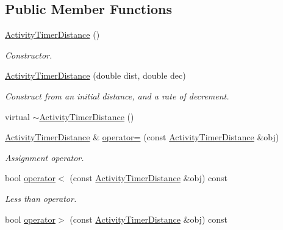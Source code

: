 \subsection*{\-Public \-Member \-Functions}
\begin{DoxyCompactItemize}
\item 
\hyperlink{classcryomesh_1_1components_1_1ActivityTimerDistance_a3da36944fccd3512740a63fdae13de20}{\-Activity\-Timer\-Distance} ()
\begin{DoxyCompactList}\small\item\em \-Constructor. \end{DoxyCompactList}\item 
\hyperlink{classcryomesh_1_1components_1_1ActivityTimerDistance_a09f1241cc4c1ddd4423ac288e534b1e1}{\-Activity\-Timer\-Distance} (double dist, double dec)
\begin{DoxyCompactList}\small\item\em \-Construct from an initial distance, and a rate of decrement. \end{DoxyCompactList}\item 
virtual \hyperlink{classcryomesh_1_1components_1_1ActivityTimerDistance_ac31091719dbdcebb505a47a2ed99fc4e}{$\sim$\-Activity\-Timer\-Distance} ()
\item 
\hyperlink{classcryomesh_1_1components_1_1ActivityTimerDistance}{\-Activity\-Timer\-Distance} \& \hyperlink{classcryomesh_1_1components_1_1ActivityTimerDistance_a37992cab5a1bfde00c8f069fc47a7c2f}{operator=} (const \hyperlink{classcryomesh_1_1components_1_1ActivityTimerDistance}{\-Activity\-Timer\-Distance} \&obj)
\begin{DoxyCompactList}\small\item\em \-Assignment operator. \end{DoxyCompactList}\item 
bool \hyperlink{classcryomesh_1_1components_1_1ActivityTimerDistance_a36db36aad72526f4d1541213ed762c01}{operator$<$} (const \hyperlink{classcryomesh_1_1components_1_1ActivityTimerDistance}{\-Activity\-Timer\-Distance} \&obj) const 
\begin{DoxyCompactList}\small\item\em \-Less than operator. \end{DoxyCompactList}\item 
bool \hyperlink{classcryomesh_1_1components_1_1ActivityTimerDistance_ae33ecef3ba181aec976ceb6304fc7935}{operator$>$} (const \hyperlink{classcryomesh_1_1components_1_1ActivityTimerDistance}{\-Activity\-Timer\-Distance} \&obj) const 

\end{DoxyCompactItemize}
